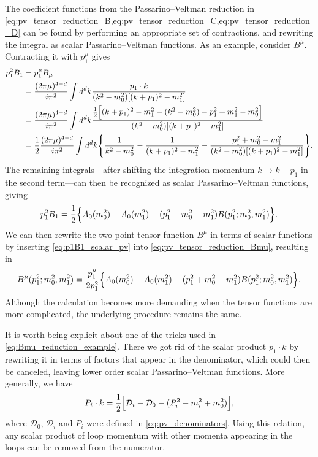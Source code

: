 The coefficient functions from the Passarino--Veltman reduction in \cref{eq:pv_tensor_reduction_B,eq:pv_tensor_reduction_C,eq:pv_tensor_reduction_D} can be found by performing an appropriate set of contractions, and rewriting the integral as scalar Passarino--Veltman functions. As an example, consider $B^\mu$. Contracting it with $p_1^\mu$ gives
\begin{align}\label{eq:Bmu_reduction_example}
    p_1^2 B_1 &= p_1^\mu B_\mu
    \nonumber \\
    & = \frac{(2\pi\mu)^{4-d}}{i\pi^2} \int d^dk \frac{p_1\cdot k}{(k^2-m_0^2)[(k+p_1)^2-m_1^2]}
    \nonumber \\
    &= \frac{(2\pi\mu)^{4-d}}{i\pi^2} \int d^dk \frac{\frac{1}{2}\Bigl[ (k+p_1)^2-m_1^2 -(k^2-m_0^2) - p_1^2 + m_1^2 - m_0^2 \Bigr]}{(k^2-m_0^2)[(k+p_1)^2-m_1^2]}
    \nonumber \\
    &= \frac{1}{2} \frac{(2\pi\mu)^{4-d}}{i\pi^2} \int d^dk \Biggl\{
        \frac{1}{k^2-m_0^2} - \frac{1}{(k+p_1)^2-m_1^2} - \frac{p_1^2+m_0^2-m_1^2}{(k^2-m_0^2)[(k+p_1)^2-m_1^2]}
    \Biggr\}.
\end{align}
The remaining integrals---after shifting the integration momentum $k\to k-p_1$ in the second term---can then be recognized as scalar Passarino--Veltman functions, giving
\begin{equation}\label{eq:p1B1_scalar_pv}
    p_1^2 B_1 = \frac{1}{2} \Bigl\{ A_0(m_0^2) - A_0(m_1^2) - (p_1^2+m_0^2-m_1^2)B(p_1^2;m_0^2,m_1^2) \Bigr\}.
\end{equation}
We can then rewrite the two-point tensor function $B^\mu$ in terms of scalar functions by inserting \cref{eq:p1B1_scalar_pv} into \cref{eq:pv_tensor_reduction_Bmu}, resulting in
\begin{equation}
    B^\mu(p_1^2;m_0^2,m_1^2) = \frac{p_1^\mu}{2p_1^2} \Bigl\{ A_0(m_0^2) - A_0(m_1^2) - (p_1^2+m_0^2-m_1^2)B(p_1^2;m_0^2,m_1^2) \Bigr\}.
\end{equation}
Although the calculation becomes more demanding when the tensor functions are more complicated, the underlying procedure remains the same.

It is worth being explicit about one of the tricks used in \cref{eq:Bmu_reduction_example}.
There we got rid of the scalar product $p_1\cdot k$ by rewriting it in terms of factors that appear in the denominator, which could then be canceled, leaving lower order scalar Passarino--Veltman functions.
More generally, we have
\begin{equation}\label{eq:pv_scalar_product}
    P_i\cdot k = \frac{1}{2} \Bigl[ \mathcal{D}_i - \mathcal{D}_0 - (P_i^2 - m_i^2 + m_0^2) \Bigr],
\end{equation}
where $\mathcal{D}_0$, $\mathcal{D}_i$ and $P_i$ were defined in \cref{eq:pv_denominators}.
Using this relation, any scalar product of loop momentum with other momenta appearing in the loops can be removed from the numerator.
